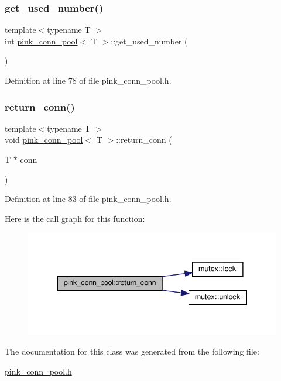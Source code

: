 \subsubsection{\texorpdfstring{get\+\_\+used\+\_\+number()}{get\_used\_number()}}
{\footnotesize\ttfamily template$<$typename T $>$ \\
int \hyperlink{classpink__conn__pool}{pink\+\_\+conn\+\_\+pool}$<$ T $>$\+::get\+\_\+used\+\_\+number (\begin{DoxyParamCaption}{ }\end{DoxyParamCaption})}



Definition at line 78 of file pink\+\_\+conn\+\_\+pool.\+h.

\mbox{\label{classpink__conn__pool_a331df25708f142559d051ab8859ed707}} 
\subsubsection{\texorpdfstring{return\+\_\+conn()}{return\_conn()}}
{\footnotesize\ttfamily template$<$typename T $>$ \\
void \hyperlink{classpink__conn__pool}{pink\+\_\+conn\+\_\+pool}$<$ T $>$\+::return\+\_\+conn (\begin{DoxyParamCaption}\item[{T $\ast$}]{conn }\end{DoxyParamCaption})}



Definition at line 83 of file pink\+\_\+conn\+\_\+pool.\+h.

Here is the call graph for this function\+:\nopagebreak
\begin{figure}[H]
\begin{center}
\leavevmode
\includegraphics[width=335pt]{classpink__conn__pool_a331df25708f142559d051ab8859ed707_cgraph}
\end{center}
\end{figure}


The documentation for this class was generated from the following file\+:\begin{DoxyCompactItemize}
\item 
\hyperlink{pink__conn__pool_8h}{pink\+\_\+conn\+\_\+pool.\+h}\end{DoxyCompactItemize}
